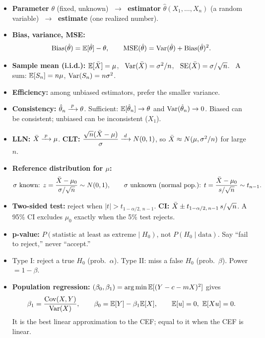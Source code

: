 \documentclass[11pt]{article}
\begin{document}
\begin{keybox}
\begin{itemize}
  \item \textbf{Parameter} $\theta$ (fixed, unknown) $\;\to\;$ \textbf{estimator} $\hat\theta(X_1,\dots,X_n)$ (a random variable) $\;\to\;$ \textbf{estimate} (one realized number).
  \item \textbf{Bias, variance, MSE:}
  \[ \operatorname{Bias}(\hat\theta)=\mathbb{E}[\hat\theta]-\theta, \qquad \operatorname{MSE}(\hat\theta)=\operatorname{Var}(\hat\theta)+\operatorname{Bias}(\hat\theta)^2. \]
  \item \textbf{Sample mean (i.i.d.):} $\mathbb{E}[\bar{X}]=\mu$, \ $\operatorname{Var}(\bar{X})=\sigma^2/n$, \ $\operatorname{SE}(\bar{X})=\sigma/\sqrt n$. \ A sum: $\mathbb{E}[S_n]=n\mu$, $\operatorname{Var}(S_n)=n\sigma^2$.
  \item \textbf{Efficiency:} among unbiased estimators, prefer the smaller variance.
  \item \textbf{Consistency:} $\hat\theta_n\xrightarrow{\;p\;}\theta$. Sufficient: $\mathbb{E}[\hat\theta_n]\to\theta$ and $\operatorname{Var}(\hat\theta_n)\to0$. Biased can be consistent; unbiased can be inconsistent ($X_1$).
  \item \textbf{LLN:} $\bar{X}\xrightarrow{\;p\;}\mu$. \quad \textbf{CLT:} $\dfrac{\sqrt n(\bar{X}-\mu)}{\sigma}\xrightarrow{\;d\;} N(0,1)$, so $\bar{X}\approx N(\mu,\sigma^2/n)$ for large $n$.
\end{itemize}
\end{keybox}

\begin{keybox}
\begin{itemize}
  \item \textbf{Reference distribution for $\mu$:}
  \[ \sigma \text{ known: } z=\frac{\bar{X}-\mu_0}{\sigma/\sqrt n}\sim N(0,1), \qquad \sigma \text{ unknown (normal pop.): } t=\frac{\bar{X}-\mu_0}{s/\sqrt n}\sim t_{n-1}. \]
  \item \textbf{Two-sided test:} reject when $|t|>t_{1-\alpha/2,\,n-1}$. \quad \textbf{CI:} $\bar{X}\pm t_{1-\alpha/2,\,n-1}\,s/\sqrt n$. A 95\% CI excludes $\mu_0$ exactly when the 5\% test rejects.
  \item \textbf{p-value:} $P(\text{statistic at least as extreme}\mid H_0)$, not $P(H_0\mid\text{data})$. Say ``fail to reject,'' never ``accept.''
  \item Type I: reject a true $H_0$ (prob.\ $\alpha$). Type II: miss a false $H_0$ (prob.\ $\beta$). Power $=1-\beta$.
  \item \textbf{Population regression:} $(\beta_0,\beta_1)=\operatorname*{arg\,min}\mathbb{E}[(Y-c-mX)^2]$ gives
  \[ \beta_1=\frac{\operatorname{Cov}(X,Y)}{\operatorname{Var}(X)}, \qquad \beta_0=\mathbb{E}[Y]-\beta_1\mathbb{E}[X], \qquad \mathbb{E}[u]=0,\ \mathbb{E}[Xu]=0. \]
  It is the best linear approximation to the CEF; equal to it when the CEF is linear.
\end{itemize}
\end{keybox}
\end{document}
